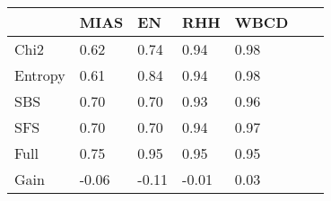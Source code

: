 \begin{tabular}{|l|l|l|l|l|l|l|}
\toprule
{} &  MIAS &    EN &   RHH & WBCD \\
\midrule
Chi2    &  0.62 &  0.74 &  0.94 & 0.98 \\
Entropy &  0.61 &  0.84 &  0.94 & 0.98 \\
SBS     &  0.70 &  0.70 &  0.93 & 0.96 \\
SFS     &  0.70 &  0.70 &  0.94 & 0.97 \\
Full    &  0.75 &  0.95 &  0.95 & 0.95 \\
Gain    & -0.06 & -0.11 & -0.01 & 0.03 \\
\bottomrule
\end{tabular}
